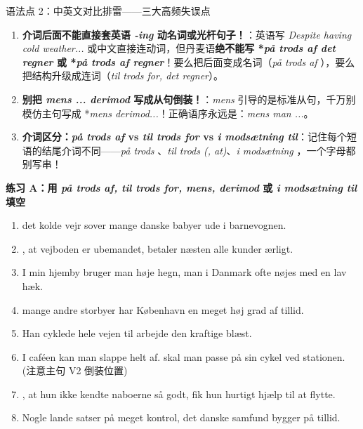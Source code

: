 \begin{grammatikbox}{语法点 2：中英文对比排雷——三大高频失误点}
\begin{enumerate}
  \item \textbf{介词后面不能直接套英语 \textit{-ing} 动名词或光杆句子！}：英语写 \textit{Despite having cold weather...} 或中文直接连动词，但丹麦语\textbf{绝不能写 *\textit{på trods af det regner} 或 *\textit{på trods af regner}}！要么把后面变成名词（\textit{på trods af }），要么把结构升级成连词（\textit{til trods for,  det regner}）。
  \item \textbf{别把 \textit{mens ... derimod} 写成从句倒装！}：\textit{mens} 引导的是标准从句，千万别模仿主句写成 *\textit{mens  derimod...}！正确语序永远是：\textit{mens man ...}。
  \item \textbf{介词区分：\textit{på trods af} vs \textit{til trods for} vs \textit{i modsætning til}}：记住每个短语的结尾介词不同——\textit{på trods }、\textit{til trods  (, at)}、\textit{i modsætning }，一个字母都别写串！
\end{enumerate}
\end{grammatikbox}


\textbf{练习 A：用 \textit{på trods af, til trods for, mens, derimod} 或 \textit{i modsætning til} 填空}
\begin{enumerate}
  \item \underline{\hspace{2.4cm}} det kolde vejr sover mange danske babyer ude i barnevognen.
  \item \underline{\hspace{2.6cm}}, at vejboden er ubemandet, betaler næsten alle kunder ærligt.
  \item I min hjemby bruger man høje hegn, \underline{\hspace{1.6cm}} man i Danmark \underline{\hspace{1.8cm}} ofte nøjes med en lav hæk.
  \item \underline{\hspace{2.8cm}} mange andre storbyer har København en meget høj grad af tillid.
  \item Han cyklede hele vejen til arbejde \underline{\hspace{2.4cm}} den kraftige blæst.
  \item I caféen kan man slappe helt af. \underline{\hspace{2.0cm}} skal man passe på sin cykel ved stationen. (注意主句 V2 倒装位置)
  \item \underline{\hspace{2.6cm}}, at hun ikke kendte naboerne så godt, fik hun hurtigt hjælp til at flytte.
  \item Nogle lande satser på meget kontrol, \underline{\hspace{1.6cm}} det danske samfund \underline{\hspace{1.8cm}} bygger på tillid.
\end{enumerate}

